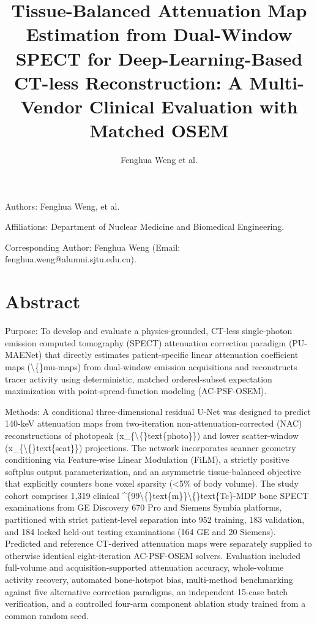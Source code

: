\documentclass[11pt]{article}
\begin{document}
\title{\textbf{Tissue-Balanced Attenuation Map Estimation from Dual-Window SPECT for Deep-Learning-Based CT-less Reconstruction: A Multi-Vendor Clinical Evaluation with Matched OSEM}}\author{Fenghua Weng et al.}\date{}\maketitle
Authors: Fenghua Weng, et al.  \par

Affiliations: Department of Nuclear Medicine and Biomedical Engineering.  \par

Corresponding Author: Fenghua Weng (Email: fenghua.weng@alumni.sjtu.edu.cn).\par

\section*{Abstract}
Purpose: To develop and evaluate a physics-grounded, CT-less single-photon emission computed tomography (SPECT) attenuation correction paradigm (PU-MAENet) that directly estimates patient-specific linear attenuation coefficient maps (\textbackslash\{\}mu-maps) from dual-window emission acquisitions and reconstructs tracer activity using deterministic, matched ordered-subset expectation maximization with point-spread-function modeling (AC-PSF-OSEM).\par

Methods: A conditional three-dimensional residual U-Net was designed to predict 140-keV attenuation maps from two-iteration non-attenuation-corrected (NAC) reconstructions of photopeak (x\_\{\textbackslash\{\}text\{photo\}\}) and lower scatter-window (x\_\{\textbackslash\{\}text\{scat\}\}) projections. The network incorporates scanner geometry conditioning via Feature-wise Linear Modulation (FiLM), a strictly positive softplus output parameterization, and an asymmetric tissue-balanced objective that explicitly counters bone voxel sparsity (<5\% of body volume). The study cohort comprises 1,319 clinical \textasciicircum{}\{99\textbackslash\{\}text\{m\}\}\textbackslash\{\}text\{Tc\}-MDP bone SPECT examinations from GE Discovery 670 Pro and Siemens Symbia platforms, partitioned with strict patient-level separation into 952 training, 183 validation, and 184 locked held-out testing examinations (164 GE and 20 Siemens). Predicted and reference CT-derived attenuation maps were separately supplied to otherwise identical eight-iteration AC-PSF-OSEM solvers. Evaluation included full-volume and acquisition-supported attenuation accuracy, whole-volume activity recovery, automated bone-hotspot bias, multi-method benchmarking against five alternative correction paradigms, an independent 15-case batch verification, and a controlled four-arm component ablation study trained from a common random seed.\par
\end{document}
